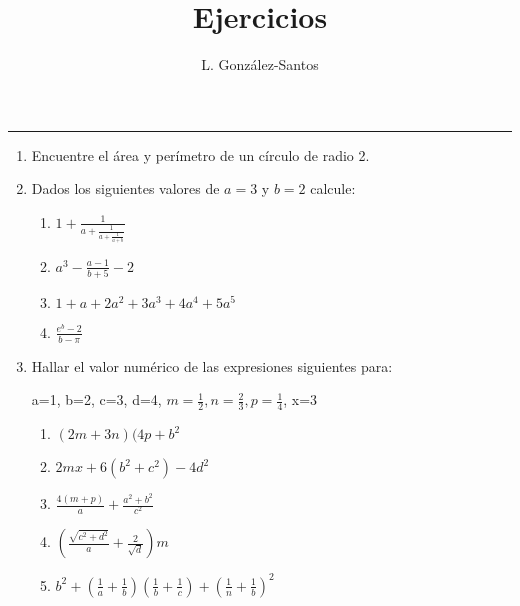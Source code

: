 \documentclass[a4paper]{article}
\title{Ejercicios}
\author{L. González-Santos}
\begin{document}
\maketitle

\hrule



\begin{enumerate}
\item Encuentre el área y perímetro de un  círculo de radio 2.
\item Dados los siguientes valores de $a=3$ y $b=2$ calcule:

\begin{enumerate}
\item $1+ \frac{1}{a+\frac{1}{a+\frac{1}{a+b}}}$
\item $a^3-\frac{a-1}{b+5}-2$
\item $1+a+2a^2+3a^3+ 4a^4 + 5a^5$
\item $\frac{e^b-2}{b-\pi}$
\end{enumerate}

\item Hallar el valor numérico de las expresiones siguientes para:

a=1, b=2, c=3, d=4, $m=\frac{1}{2}, n=\frac{2}{3}, p=\frac{1}{4}$, x=3

\begin{enumerate}
\item $(2m+3n)(4p + b^2$
\item $2mx + 6(b^2 + c^2) - 4d^2$
\item $\frac{4(m+p)}{a} + \frac{a^2+b^2}{c^2}$
\item $(\frac{\sqrt{c^2+d^2}}{a} + \frac{2}{\sqrt{d}})m$
\item $b^2+(\frac{1}{a}+ \frac{1}{b})(\frac{1}{b}+ \frac{1}{c}) + (\frac{1}{n}+ \frac{1}{b})^2$
\end{enumerate}
\end{enumerate}  
\end{document}
